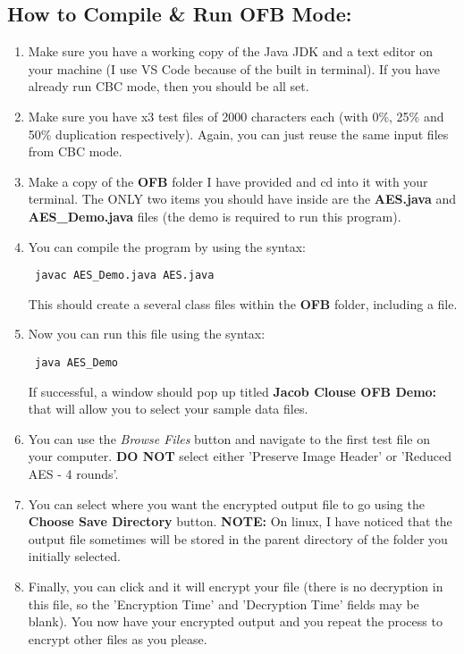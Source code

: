 \documentclass[10pt]{article}
\begin{document}
\subsection{How to Compile \& Run OFB Mode: } 
\begin{enumerate}
	\item Make sure you have a working copy of the Java JDK and a text editor on your machine (I use VS Code because of the built in terminal). If you have already run CBC mode, then you should be all set.
	
	\item Make sure you have x3 test files of 2000 characters each (with 0\%, 25\% and 50\% duplication respectively). Again, you can just reuse the same input files from CBC mode. 
	
	\item Make a copy of the \textbf{OFB} folder I have provided and cd into it with your terminal. The ONLY two items you should have inside are the \textbf{AES.java} and \textbf{AES\_Demo.java} files (the demo is required to run this program).
	
	\item You can compile the program by using the syntax: \begin{verbatim} javac AES_Demo.java AES.java \end{verbatim}
	This should create a several class files within the \textbf{OFB} folder, including a  file.
	
	\item Now you can run this file using the syntax: 
	\begin{verbatim} java AES_Demo \end{verbatim} 
	If successful, a window should pop up titled \textbf{Jacob Clouse OFB Demo:} that will allow you to select your sample data files. 
	
	\item You can use the \textit{Browse Files} button and navigate to the first test file on your computer. \textbf{DO NOT} select either 'Preserve Image Header' or 'Reduced AES - 4 rounds'. 
	
	\item You can select where you want the encrypted output file to go using the \textbf{Choose Save Directory} button. \textbf{NOTE:} On linux, I have noticed that the output file sometimes will be stored in the parent directory of the folder you initially selected. 
	
	\item Finally, you can click  and it will encrypt your file (there is no decryption in this file, so the 'Encryption Time' and  'Decryption Time' fields may be blank). You now have your encrypted output and you repeat the process to encrypt other files as you please.
	

\end{enumerate}
\end{document}
